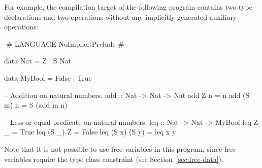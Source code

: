 For example, the compilation target of the following program
contains two type declarations and two operations
without any implicitly generated auxiliary operations:
%
\begin{curry}
{-# LANGUAGE NoImplicitPrelude #-}

data Nat = Z | S Nat

data MyBool = False | True

-- Addition on natural numbers.
add         :: Nat -> Nat -> Nat
add Z     n = n
add (S m) n = S (add m n)

-- Less-or-equal predicate on natural numbers.
leq :: Nat -> Nat -> MyBool
leq Z     _     = True
leq (S _) Z     = False
leq (S x) (S y) = leq x y
\end{curry}
%
Note that it is not possible to use free variables in this program,
since free variables require the type class constraint 
(see Section~\ref{sec:free-data}).

